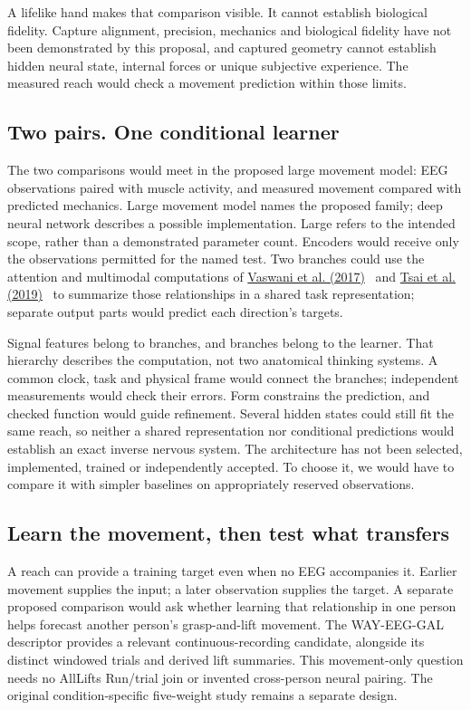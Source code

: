 A lifelike hand makes that comparison visible. It cannot establish biological
fidelity. Capture alignment, precision, mechanics and biological fidelity have
not been demonstrated by this proposal, and captured geometry cannot establish
hidden neural state, internal forces or unique subjective experience. The
measured reach would check a movement prediction within those limits.

\subsection{Two pairs. One conditional learner}
The two comparisons would meet in the proposed large movement model: EEG
observations paired with muscle activity, and measured movement compared
with predicted mechanics. Large movement model names the proposed family;
deep neural network describes a possible implementation. Large refers to
the intended scope, rather than a demonstrated parameter count. Encoders
would receive only the observations permitted for the named test. Two
branches could use the attention and multimodal computations of
\href{https://arxiv.org/html/1706.03762v7}{Vaswani et al. (2017)}~\cite{vaswani2017} and \href{https://aclanthology.org/P19-1656/}{Tsai et al. (2019)}~\cite{tsai2019} to summarize those relationships
in a shared task representation; separate output parts would predict each
direction's targets.


Signal features belong to branches, and branches belong to the learner.
That hierarchy describes the computation, not two anatomical thinking systems.
A common clock, task and physical frame would connect the branches; independent
measurements would check their errors. Form constrains the prediction, and
checked function would guide refinement. Several hidden states could still
fit the same reach, so neither a shared representation nor conditional
predictions would establish an exact inverse nervous system. The architecture
has not been selected, implemented, trained or independently accepted.
To choose it, we would have to compare it with simpler baselines on
appropriately reserved observations.

\subsection{Learn the movement, then test what transfers}

A reach can provide a training target even when no EEG accompanies it. Earlier movement supplies the input; a later observation supplies the target. A separate proposed comparison would ask whether learning that relationship in one person helps forecast another person's grasp-and-lift movement. The WAY-EEG-GAL descriptor provides a relevant continuous-recording candidate, alongside its distinct windowed trials and derived lift summaries.\citep{luciw2014way} This movement-only question needs no AllLifts Run/trial join or invented cross-person neural pairing. The original condition-specific five-weight study remains a separate design.

